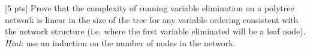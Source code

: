 \begin{question}{[5 pts]}
Prove that the complexity of running variable elimination on a polytree network is linear in the size of the tree for any variable ordering consistent with the network structure (i.e. where the first variable eliminated will be a leaf node). {\em Hint}: use an induction on the number of nodes in the network.

\end{question}
% 
